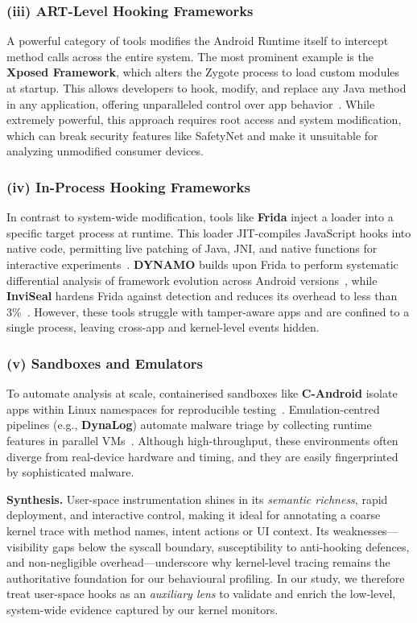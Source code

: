 \documentclass[a4paper,12pt]{report}
\begin{document}
\subsubsection*{(iii) ART-Level Hooking Frameworks}
A powerful category of tools modifies the Android Runtime itself to intercept method calls across the entire system. The most prominent example is the \textbf{Xposed Framework}, which alters the Zygote process to load custom modules at startup. This allows developers to hook, modify, and replace any Java method in any application, offering unparalleled control over app behavior~\cite{xposed}. While extremely powerful, this approach requires root access and system modification, which can break security features like SafetyNet and make it unsuitable for analyzing unmodified consumer devices.

\subsubsection*{(iv) In-Process Hooking Frameworks}
In contrast to system-wide modification, tools like \textbf{Frida} inject a loader into a specific target process at runtime. This loader JIT-compiles JavaScript hooks into native code, permitting live patching of Java, JNI, and native functions for interactive experiments~\cite{frida2020}. \textbf{DYNAMO} builds upon Frida to perform systematic differential analysis of framework evolution across Android versions~\cite{dynamo2021}, while \textbf{InviSeal} hardens Frida against detection and reduces its overhead to less than 3\%~\cite{inviseal2023}. However, these tools struggle with tamper-aware apps and are confined to a single process, leaving cross-app and kernel-level events hidden.

\subsubsection*{(v) Sandboxes and Emulators}
To automate analysis at scale, containerised sandboxes like \textbf{C-Android} isolate apps within Linux namespaces for reproducible testing~\cite{candroid2019}. Emulation-centred pipelines (e.g., \textbf{DynaLog}) automate malware triage by collecting runtime features in parallel VMs~\cite{dynalog2016}. Although high-throughput, these environments often diverge from real-device hardware and timing, and they are easily fingerprinted by sophisticated malware.

\medskip
\noindent\textbf{Synthesis.}
User-space instrumentation shines in its \emph{semantic richness}, rapid deployment, and interactive control, making it ideal for annotating a coarse kernel trace with method names, intent actions or UI context. Its weaknesses—visibility gaps below the syscall boundary, susceptibility to anti-hooking defences, and non-negligible overhead—underscore why kernel-level tracing remains the authoritative foundation for our behavioural profiling. In our study, we therefore treat user-space hooks as an \emph{auxiliary lens} to validate and enrich the low-level, system-wide evidence captured by our kernel monitors.
\end{document}

